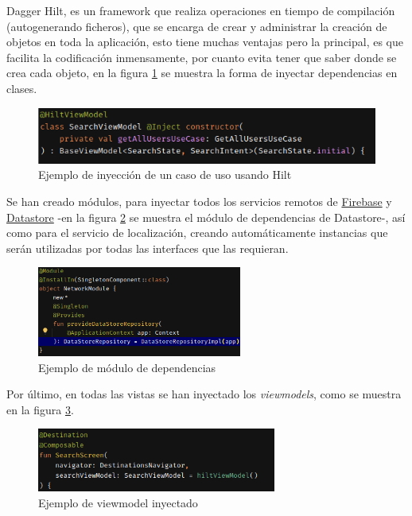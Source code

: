 Dagger Hilt, es un framework que realiza operaciones en tiempo de compilación (autogenerando ficheros), que se encarga de crear y administrar la creación de objetos en toda la aplicación, esto tiene muchas ventajas pero la principal, es que facilita la codificación inmensamente, por cuanto evita tener que saber donde se crea cada objeto, en la figura \ref{fig:ejemplo_hilt1} se muestra la forma de inyectar dependencias en clases.
\begin{figure}[h]
	\centering
	\includegraphics[width = 1\textwidth]{Imagenes/Fuentes/ejemplo_hilt1.png}
	\caption{Ejemplo de inyección de un caso de uso usando Hilt}
	\label{fig:ejemplo_hilt1}
\end{figure}

Se han creado módulos, para inyectar todos los servicios remotos de \hyperlink{subsec:firebase}{Firebase} y \hyperlink{subsec:datastore}{Datastore} -en la figura \ref{fig:ejemplo_hilt2} se muestra el módulo de dependencias de Datastore-, así como para el servicio de localización, creando automáticamente instancias que serán utilizadas por todas las interfaces que las requieran.
\begin{figure}[h]
	\centering
	\includegraphics[width = 0.6\textwidth]{Imagenes/Fuentes/ejemplo_hilt2.png}
	\caption{Ejemplo de módulo de dependencias}
	\label{fig:ejemplo_hilt2}
\end{figure}

Por último, en todas las vistas se han inyectado los \textit{viewmodels}, como se muestra en la figura \ref{fig:ejemplo_hilt3}.
\begin{figure}[h]
	\centering
	\includegraphics[width = 0.7\textwidth]{Imagenes/Fuentes/ejemplo_hilt3.png}
	\caption{Ejemplo de viewmodel inyectado}
	\label{fig:ejemplo_hilt3}
\end{figure}

